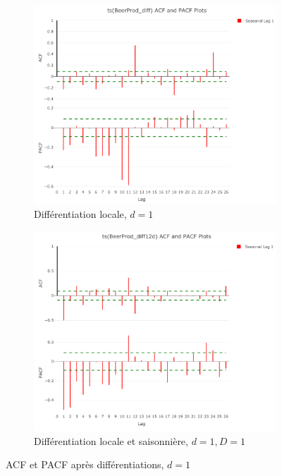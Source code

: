 \documentclass[12pt,a4paper]{book}
\newcommand{\1}{\mathds{1}}
\begin{document}
\begin{figure}[h]
\centering
	\begin{subfigure}{.4\textwidth}
    	\includegraphics[width=\textwidth]{d1D0}  
    	\caption{Différentiation locale, $d=1$}
    	\label{fig:sub1}
    \end{subfigure}
    \begin{subfigure}{.4\textwidth}
    	\includegraphics[width=\textwidth]{d1D1}  
    	\caption{Différentiation locale et saisonnière, $d=1, D=1$}
    	\label{fig:sub2}
    \end{subfigure}

\caption{ACF et PACF après différentiations, $d=1$}
\label{fig:2}
   
\end{figure}
\end{document}
